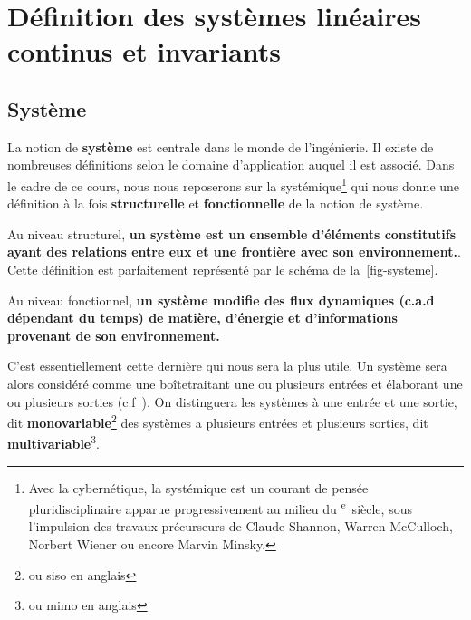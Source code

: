 \section[Définition SLCI]
        {Définition des systèmes linéaires continus et invariants}

\subsection{Système}
La notion de \textbf{système} est centrale dans le monde de l'ingénierie.
Il existe de nombreuses définitions selon le domaine 
d'application auquel il est associé. Dans le cadre de ce cours, nous nous 
reposerons sur la systémique\footnote{Avec la cybernétique, la systémique est 
un courant de pensée pluridisciplinaire apparue progressivement au milieu du 
\textsc{}\textsuperscript{e}~siècle, sous l'impulsion des 
travaux précurseurs de Claude Shannon, 
Warren McCulloch, 
Norbert Wiener 
ou encore Marvin Minsky.} 
qui nous donne une définition à la fois \textbf{structurelle} et 
\textbf{fonctionnelle} de la notion de système.

Au niveau structurel, \textbf{un système est un ensemble 
d'éléments constitutifs ayant des relations entre eux et 
une frontière avec son environnement.}. Cette définition est parfaitement
représenté par le schéma de la~\cref{fig-systeme}.

Au niveau fonctionnel, \textbf{un système modifie des flux dynamiques 
(c.a.d dépendant du temps) de matière, d'énergie et d'informations provenant 
de son environnement.}

C'est essentiellement cette dernière qui nous sera la plus utile.
Un système sera alors considéré comme 
une \og boîte\fg traitant une ou plusieurs entrées et élaborant une ou 
plusieurs sorties (c.f~). On distinguera les systèmes à 
une entrée et une sortie, dit \textbf{monovariable}\footnote{ou \gls{siso} 
en anglais} des systèmes  a plusieurs entrées et plusieurs sorties, dit 
\textbf{multivariable}\footnote{ou \gls{mimo} en anglais}.


